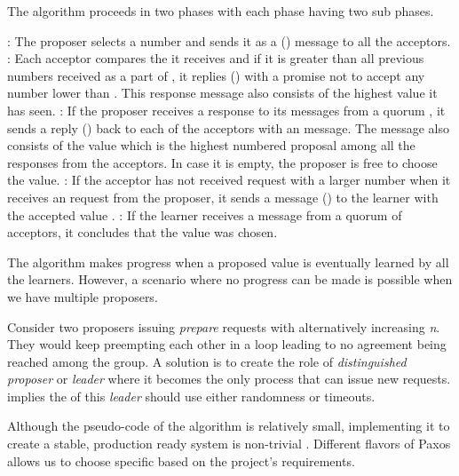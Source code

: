 The algorithm proceeds in two phases with each phase having two sub phases.

\begin{itemize}
  : The proposer selects a number  and sends it as a
   () message to all the acceptors.
  : Each acceptor compares the  it
  receives and if it is greater than all previous numbers received as a part of
  , it replies () with a promise not to accept any
  number lower than . This response message also consists of the
  highest value  it has seen.
  : If the proposer receives a response to its 
  messages from a quorum%
  , it sends a reply () back to each of the acceptors with an
   message. The message also consists of the value 
  which is the highest numbered proposal among all the responses from the
  acceptors. In case it is empty, the proposer is free to choose the value.
  : If the acceptor has not received  request
  with a larger number when it receives an  request from the
  proposer, it sends a message () to the learner with the accepted
  value .
  : If the learner receives a message from a quorum of
  acceptors, it concludes that the value  was chosen.
\end{itemize}

The algorithm makes progress when a proposed value is eventually learned by all
the learners. However, a scenario where no progress can be made is possible
when we have multiple proposers.

Consider two proposers issuing \emph{prepare}
requests with alternatively increasing \emph{n}. They would keep
preempting each other in a loop leading to no agreement being reached among the
group. A solution is to create the role of \emph{distinguished proposer} or
\emph{leader} where it becomes the only process that can issue new requests.
\citet{FisLynPat85} implies the  of this \emph{leader}
should use either randomness or timeouts.

Although the pseudo-code of the algorithm is relatively small, implementing it
to create a stable, production ready system is non-trivial \citep{ChandraGR07}.
Different flavors of Paxos allows us to choose specific based on the project's
requirements.

